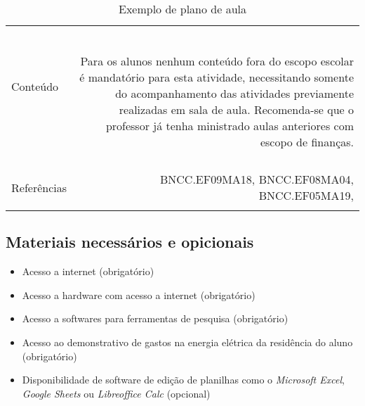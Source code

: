 \begin{table}[H]
\begin{tabular}{|l|r|}
	& \\
	& \\	
	& \\	
	& \\
	& \\
	\hline
	& \\ 
	Conteúdo & \multirow{3}{11cm}{Para os alunos nenhum conteúdo fora do escopo escolar é mandatório para esta atividade, necessitando somente do acompanhamento das atividades previamente realizadas em sala de aula. Recomenda-se que o professor já tenha ministrado aulas anteriores com escopo de finanças.} \\
	& \\
	& \\
	& \\	
	& \\	
	& \\
	\hline
	& \\
	Referências &  \multirow{1}{11cm}{BNCC.EF09MA18, BNCC.EF08MA04, BNCC.EF05MA19, }\\
& \\
	\hline
\end{tabular}
		\caption{Exemplo de plano de aula}
\end{table}

\subsection{Materiais necessários e opicionais}
\begin{itemize}
	\item Acesso a internet (obrigatório)
	\item Acesso a hardware com acesso a internet (obrigatório) 
	\item Acesso a softwares para ferramentas de pesquisa (obrigatório)
	\item Acesso ao demonstrativo de gastos na energia elétrica da residência do aluno (obrigatório)
	\item Disponibilidade de software de edição de planilhas como o \textit{Microsoft Excel}, \textit{Google Sheets} ou \textit{Libreoffice Calc} (opcional) 
	
\end{itemize}





